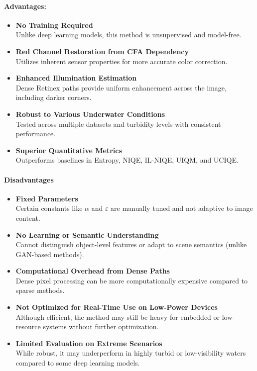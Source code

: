 \paragraph{Advantages:}
\begin{itemize}
    \item \textbf{No Training Required} \\
          Unlike deep learning models, this method is unsupervised and model-free.

    \item \textbf{Red Channel Restoration from CFA Dependency} \\
          Utilizes inherent sensor properties for more accurate color correction.

    \item \textbf{Enhanced Illumination Estimation} \\
          Dense Retinex paths provide uniform enhancement across the image, including darker corners.

    \item \textbf{Robust to Various Underwater Conditions} \\
          Tested across multiple datasets and turbidity levels with consistent performance.

    \item \textbf{Superior Quantitative Metrics} \\
          Outperforms baselines in Entropy, NIQE, IL-NIQE, UIQM, and UCIQE.
\end{itemize}

\paragraph{Disadvantages}

\begin{itemize}
    \item \textbf{Fixed Parameters} \\
          Certain constants like $\alpha$ and $\varepsilon$ are manually tuned and not adaptive to image content.

    \item \textbf{No Learning or Semantic Understanding} \\
          Cannot distinguish object-level features or adapt to scene semantics (unlike GAN-based methods).

    \item \textbf{Computational Overhead from Dense Paths} \\
          Dense pixel processing can be more computationally expensive compared to sparse methods.

    \item \textbf{Not Optimized for Real-Time Use on Low-Power Devices} \\
          Although efficient, the method may still be heavy for embedded or low-resource systems without further optimization.

    \item \textbf{Limited Evaluation on Extreme Scenarios} \\
          While robust, it may underperform in highly turbid or low-visibility waters compared to some deep learning models.
\end{itemize}